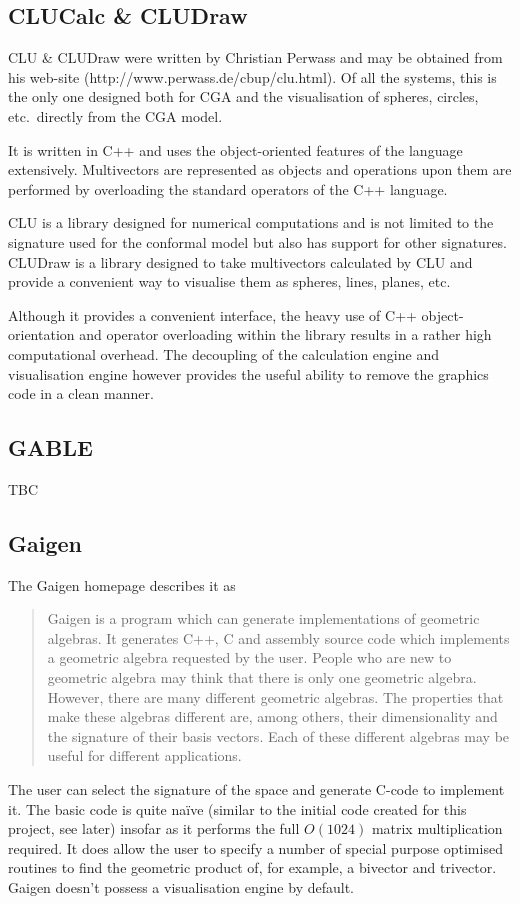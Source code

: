 \subsection{CLUCalc \& CLUDraw}


CLU \& CLUDraw were written by Christian Perwass and may be obtained from his
web-site (http://www.perwass.de/cbup/clu.html). Of all the systems, this
is the only one designed both for CGA and the visualisation of spheres,
circles, etc.\ directly from the CGA model.

It is written in C++ and uses the object-oriented features of the language
extensively. Multivectors are represented as objects and operations upon
them are performed by overloading the standard operators of the C++
language. 

CLU is a library designed for numerical computations and is not limited
to the signature used for the conformal model but also has support for
other signatures. CLUDraw is a library designed to take multivectors calculated
by CLU and provide a convenient way to visualise them as spheres, lines, planes,
etc. 

Although it provides a convenient interface, the heavy use of C++ object-orientation
and operator overloading within the library results in a rather high
computational overhead. The decoupling of the calculation engine and
visualisation engine however provides the useful ability to remove the
graphics code in a clean manner.


\subsection{GABLE}

TBC

\subsection{Gaigen}

The Gaigen 
homepage\cite{Gaigen} describes 
it as
\begin{quote}
Gaigen is a program which can generate implementations of geometric algebras. It generates C++, C and assembly source code which implements a geometric algebra requested by the user. People who are new to geometric algebra may think that there is only one geometric algebra. However, there are many different geometric algebras. The properties that make these algebras different are, among others, their dimensionality and the signature of their basis vectors. Each of these different algebras may be useful for different applications.
\end{quote}
The user can select the signature of the space and generate C-code to implement it. The
basic code is quite na\"ive (similar to the initial code created for
this project, see later) insofar as it
performs the full $O(1024)$ matrix multiplication required. It does allow the
user to specify a number of special purpose optimised routines to
find the geometric product of, for example, a bivector and trivector.
Gaigen doesn't possess a visualisation engine by default.

